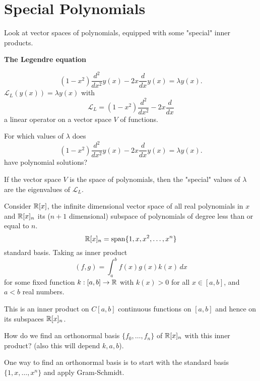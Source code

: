 \documentclass[10pt, a4paper]{article}
\begin{document}
\newpage

\section{Special Polynomials}
Look at vector spaces of polynomials,
equipped with some "special" inner products.

\textbf{The Legendre equation}

\[
(1 - x ^ 2)\frac{d ^ 2}{dx ^ 2}y(x) - 2x\frac{d}{dx}y(x) = \lambda y(x).
\]
$\mathcal{L}_L(y(x)) = \lambda y(x)$ with
\[
\mathcal{L}_L = (1 - x ^ 2)\frac{d ^ 2}{dx ^ 2} - 2x\frac{d}{dx}
\]
a linear operator on a vector space $V$ of functions.

For which values of $\lambda$ does
\[
(1 - x ^ 2)\frac{d ^ 2}{dx ^ 2}y(x) - 2x\frac{d}{dx}y(x) = \lambda y(x).
\]
have polynomial solutions?

If the vector space $V$ is the space of polynomials,
then the "special" values of $\lambda$ are the eigenvalues of $\mathcal{L}_L$.

Consider $\mathbb{R}[x]$,
the infinite dimensional vector space of all real polynomials in $x$ and $\mathbb{R}[x]_n$ its
($n + 1$ dimensional)
subspace of polynomials of degree less than or equal to $n$.
\[
\mathbb{R}[x]_n = \mathrm{span}\{1, x, x ^ 2, \dotsc, x ^ n\}
\]
standard basis.
Taking as inner product
\[
(f, g) = \int_{a}^{b}f(x)g(x)k(x)\,dx
\]
for some fixed function $k : [a, b] \rightarrow \mathbb{R}$ with $k(x) > 0$ for all $x \in [a, b]$,
and $a < b$ real numbers.

This is an inner product on $C[a, b]$ continuous functions on $[a, b]$ and hence on its subspaces $\mathbb{R}[x]_n$.

How do we find an orthonormal basis $\{f_0, \dotsc, f_n\}$ of $\mathbb{R}[x]_n$ with this inner product?
(also this will depend $k, a, b$).

One way to find an orthonormal basis is to start with the standard basis $\{1, x, \dotsc, x ^ n\}$ and apply Gram-Schmidt.
\end{document}

